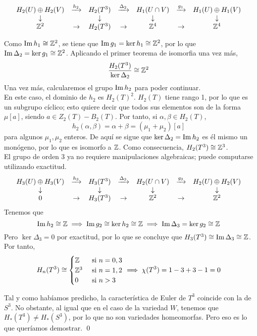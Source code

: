 \[\begin{array}{ccccccc}
H_2(U)\oplus H_2(V)	&\xrightarrow{h_2}	&H_2(T^3)&\xrightarrow{\Delta_2}&H_1(U\cap V)&\xrightarrow{g_1}&H_1(U) \oplus H_1(V)\\
\downarrow&		&\downarrow		&	&\downarrow & 	&\downarrow\\
\mathbb{Z}^2& \rightarrow	&H_2(T^3)		&\rightarrow	&\mathbb{Z}^4 & \rightarrow & \mathbb{Z}^4
\end{array}\]

Como $\operatorname{Im} h_1\cong \mathbb{Z}^2$, se tiene que $\operatorname{Im} g_1=\ker h_1\cong \mathbb{Z}^2$, por lo que $\operatorname{Im} \Delta_2=\ker g_1\cong \mathbb{Z}^2$. Aplicando el primer teorema de isomorfia una vez más, \[\frac{H_2(T^3)}{\ker \Delta_2} \cong \mathbb{Z}^2\] Una vez más, calcularemos el grupo $\operatorname{Im} h_2$ para poder continuar.
\\

En este caso, el dominio de $h_2$ es $H_2(T)^2$. $H_2(T)$ tiene rango 1, por lo que es un subgrupo cíclico; esto quiere decir que todos sus elementos son de la forma $\mu [a]$, siendo $a \in Z_2(T)-B_2(T)$. Por tanto, si $\alpha,\beta \in H_2(T)$, \[h_2(\alpha,\beta)=\alpha+\beta=(\mu_1+\mu_2)[a]\] para algunos $\mu_1,\mu_2$ enteros. De aquí se sigue que $\ker \Delta_2=\operatorname{Im} h_2$ es él mismo un monógeno, por lo que es isomorfo a $\mathbb{Z}$. Como consecuencia, $H_2(T^3)\cong \mathbb{Z}^3$.
\\

El grupo de orden 3 ya no requiere manipulaciones algebraicas; puede computarse utilizando exactitud.
\[\begin{array}{ccccccc}
H_3(U)\oplus H_3(V)	&\xrightarrow{h_3}	&H_3(T^3)		&\xrightarrow{\Delta_3}&H_2(U \cap V)&\xrightarrow{g_3}&H_2(U)\oplus H_2(V)\\
\downarrow			&					&\downarrow	&					&\downarrow & & \downarrow\\
0			&\rightarrow			&H_3(T^3)		&\rightarrow			&\mathbb{Z}^2 & \rightarrow & \mathbb{Z}^2
\end{array}\] Tenemos que \[\operatorname{Im} h_2\cong \mathbb{Z} \implies \operatorname{Im} g_2\cong \ker h_2\cong \mathbb{Z}\implies \operatorname{Im} \Delta_3=\ker g_2\cong \mathbb{Z}\] Pero $\ker \Delta_3=0$ por exactitud, por lo que se concluye que $H_3(T^3)\cong \operatorname{Im} \Delta_3 \cong \mathbb{Z}$. Por tanto, \[H_n(T^3)\cong \begin{cases}\mathbb{Z} &\mbox{ si }n=0,3\\ \mathbb{Z}^3 & \mbox{ si }n=1,2\\ 0&\mbox{ si }n > 3\end{cases} \implies \chi(T^3)=1-3+3-1=0\]

Tal y como habíamos predicho, la característica de Euler de $T^3$ coincide con la de $S^3$. No obstante, al igual que en el caso de la variedad $W$, tenemos que $H_*(T^3)\neq H_*(S^3)$, por lo que no son variedades homeomorfas. Pero eso es lo que queríamos demostrar. \qed
